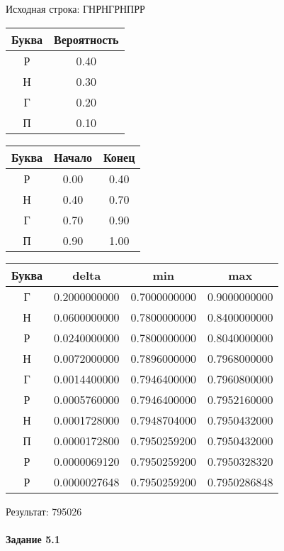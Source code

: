 \documentclass[a4paper, 12pt]{article}
\begin{document}
Исходная строка: ГНРНГРНПРР\
\begin{center}
 \begin{tabular}{ |c|c| } 
  \hline
     Буква & Вероятность \\ \hline
Р & 0.40\\\hline
Н & 0.30\\\hline
Г & 0.20\\\hline
П & 0.10
\\ \hline \end{tabular}
\end{center}
\begin{center}
 \begin{tabular}{ |c|c|c| } 
  \hline
     Буква & Начало & Конец \\ \hline
Р & 0.00 & 0.40\\\hline
Н & 0.40 & 0.70\\\hline
Г & 0.70 & 0.90\\\hline
П & 0.90 & 1.00
\\ \hline \end{tabular}
\end{center}
\begin{center}
 \begin{tabular}{ |c|c|c|c| } 
  \hline
     Буква & delta & min & max \\ \hline
Г & 0.2000000000 & 0.7000000000 & 0.9000000000\\\hline
Н & 0.0600000000 & 0.7800000000 & 0.8400000000\\\hline
Р & 0.0240000000 & 0.7800000000 & 0.8040000000\\\hline
Н & 0.0072000000 & 0.7896000000 & 0.7968000000\\\hline
Г & 0.0014400000 & 0.7946400000 & 0.7960800000\\\hline
Р & 0.0005760000 & 0.7946400000 & 0.7952160000\\\hline
Н & 0.0001728000 & 0.7948704000 & 0.7950432000\\\hline
П & 0.0000172800 & 0.7950259200 & 0.7950432000\\\hline
Р & 0.0000069120 & 0.7950259200 & 0.7950328320\\\hline
Р & 0.0000027648 & 0.7950259200 & 0.7950286848
\\ \hline \end{tabular}
\end{center}
Результат: 795026
\pagebreak
\paragraph{Задание 5.1 \\
}
\end{document}
